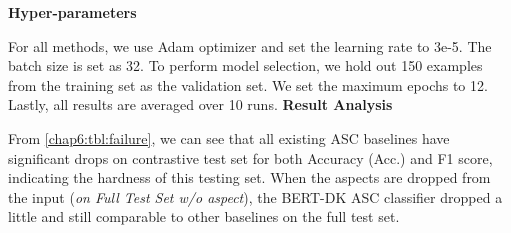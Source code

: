 \textbf{Hyper-parameters}

For all methods, we use Adam optimizer and set the learning rate to 3e-5. The batch size is set as 32.
To perform model selection, we hold out 150 examples from the training set as the validation set.
We set the maximum epochs to 12.
Lastly, all results are averaged over 10 runs.
\textbf{Result Analysis}

From \ref{chap6:tbl:failure}, %
we can see that all existing ASC baselines have significant drops on contrastive test set for both Accuracy (Acc.) and F1 score, indicating the hardness of this testing set.
When the aspects are dropped from the input (\emph{on Full Test Set w/o aspect}), the BERT-DK ASC classifier dropped a little and still comparable to other baselines on the full test set.


